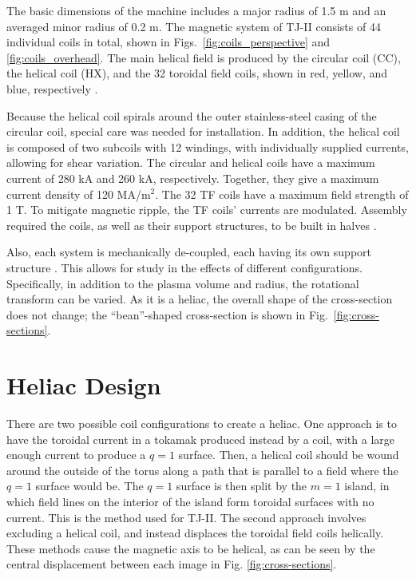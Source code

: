 \documentclass[a4paper]{article}
\begin{document}
The basic dimensions of the machine includes a major radius of 1.5 m and an averaged minor radius of 0.2 m.
The magnetic system of TJ-II consists of 44 individual coils in total, shown in Figs.~\ref{fig:coils_perspective} and \ref{fig:coils_overhead}.
The main helical field is produced by the circular coil (CC), the helical coil (HX), and the 32 toroidal field coils, shown in red, yellow, and blue, respectively \cite{tj-ii_nodate}.

Because the helical coil spirals around the outer stainless-steel casing of the circular coil, special care was needed for installation.
In addition, the helical coil is composed of two subcoils with 12 windings, with individually supplied currents, allowing for shear variation.
The circular and helical coils have a maximum current of 280 kA and 260 kA, respectively.
Together, they give a maximum current density of 120 MA/m$^2$.
The 32 TF coils have a maximum field strength of 1 T.
To mitigate magnetic ripple, the TF coils' currents are modulated.
Assembly required the coils, as well as their support structures, to be built in halves \cite{ascasibar_overview_2001}.

Also, each system is mechanically de-coupled, each having its own support structure \cite{ascasibar_overview_2001}.
This allows for study in the effects of different configurations.
Specifically, in addition to the plasma volume and radius, the rotational transform can be varied.
As it is a heliac, the overall shape of the cross-section does not change; the ``bean''-shaped cross-section is shown in Fig.~\ref{fig:cross-sections}.


\section*{Heliac Design}
There are two possible coil configurations to create a heliac.
One approach is to have the toroidal current in a tokamak produced instead by a coil, with a large enough current to produce a $q = 1$ surface.
Then, a helical coil should be wound around the outside of the torus along a path that is parallel to a field where the $q = 1$ surface would be.
The $q = 1$ surface is then split by the $m = 1$ island, in which field lines on the interior of the island form toroidal surfaces with no current.
This is the method used for TJ-II.
The second approach involves excluding a helical coil, and instead displaces the toroidal field coils helically\cite{boozer_what_1998}.
These methods cause the magnetic axis to be helical, as can be seen by the central displacement between each image in Fig. \ref{fig:cross-sections}.
\end{document}
